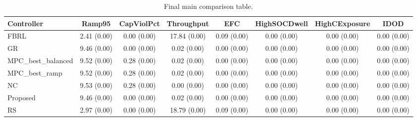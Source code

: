 \begin{table}[t]
\centering
\caption{Final main comparison table.}
\label{tab:results_final_auto}
\begin{tabular}{lccccccc}
\toprule
Controller & Ramp95 & CapViolPct & Throughput & EFC & HighSOCDwell & HighCExposure & IDOD \\
\midrule
FBRL & 2.41 (0.00) & 0.00 (0.00) & 17.84 (0.00) & 0.09 (0.00) & 0.00 (0.00) & 0.00 (0.00) & 0.00 (0.00) \\
GR & 9.46 (0.00) & 0.00 (0.00) & 0.02 (0.00) & 0.00 (0.00) & 0.00 (0.00) & 0.00 (0.00) & 0.00 (0.00) \\
MPC\_best\_balanced & 9.52 (0.00) & 0.28 (0.00) & 0.02 (0.00) & 0.00 (0.00) & 0.00 (0.00) & 0.00 (0.00) & 0.00 (0.00) \\
MPC\_best\_ramp & 9.52 (0.00) & 0.28 (0.00) & 0.02 (0.00) & 0.00 (0.00) & 0.00 (0.00) & 0.00 (0.00) & 0.00 (0.00) \\
NC & 9.53 (0.00) & 0.28 (0.00) & 0.00 (0.00) & 0.00 (0.00) & 0.00 (0.00) & 0.00 (0.00) & 0.00 (0.00) \\
Proposed & 9.46 (0.00) & 0.00 (0.00) & 0.02 (0.00) & 0.00 (0.00) & 0.00 (0.00) & 0.00 (0.00) & 0.00 (0.00) \\
RS & 2.97 (0.00) & 0.00 (0.00) & 18.79 (0.00) & 0.09 (0.00) & 0.00 (0.00) & 0.00 (0.00) & 0.00 (0.00) \\
\bottomrule
\end{tabular}
\end{table}